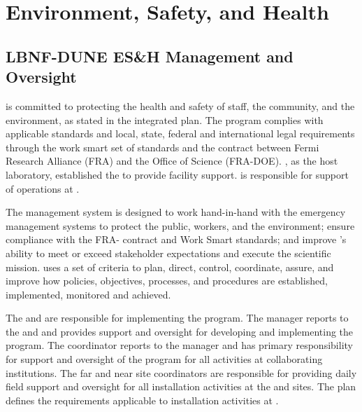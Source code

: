 \section{Environment, Safety, and Health}
\label{sec:es-tc-eshq}

\subsection{LBNF-DUNE ES\&H Management and Oversight}
\label{sec:es-tc-eshq-prog}

 is committed to protecting the health and
safety of staff, the community, and the environment, as stated in the
 integrated  plan.  
The   program complies with applicable
standards and local, state, federal and international legal
requirements through the \fnal work smart set of standards and the
contract between Fermi Research Alliance (FRA) and the 
Office of Science (FRA-DOE). \fnal, as the host laboratory,
established the  to provide facility support.
 is responsible for support of 
operations at .


The   management system is
designed to work hand-in-hand with the  emergency
management systems to protect the public, workers, and the environment;
ensure compliance with the FRA- contract and \fnal Work Smart
standards; and improve  's ability to meet or
exceed stakeholder expectations and execute the
scientific mission.   uses a set of criteria to plan, direct,
control, coordinate, assure, and improve how  policies,
objectives, processes, and procedures are established, implemented,
monitored and achieved.




The  and  are responsible for
implementing the   program.  The
  manager reports  to the
 and  and provides
 support and oversight for developing and implementing the
  program. The  
coordinator reports to the  
manager and has primary responsibility for  support and
oversight of the   program for all activities
at collaborating institutions. %
The far and near site  coordinators are responsible for providing 
daily field support and
oversight for all installation activities at the 
and  sites. 
The   plan defines the 
requirements applicable to installation activities at . 

